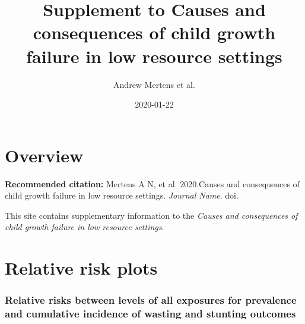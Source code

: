 \documentclass[9pt,]{book}
\title{Supplement to Causes and consequences of child growth failure in low
resource settings}
\author{Andrew Mertens et al.}
\date{2020-01-22}
\begin{document}
\maketitle

{
\setcounter{tocdepth}{1}
\tableofcontents
}
\chapter{Overview}\label{overview}

\textbf{Recommended citation:} Mertens A N, et al. 2020.Causes and
consequences of child growth failure in low resource settings.
\emph{Journal Name}. doi.

This site contains supplementary information to the \emph{Causes and
consequences of child growth failure in low resource settings}.

\chapter{Relative risk plots}\label{RR}

\raggedright

\subsection{Relative risks between levels of all exposures for
prevalence and cumulative incidence of wasting and stunting
outcomes}\label{relative-risks-between-levels-of-all-exposures-for-prevalence-and-cumulative-incidence-of-wasting-and-stunting-outcomes}
\end{document}
